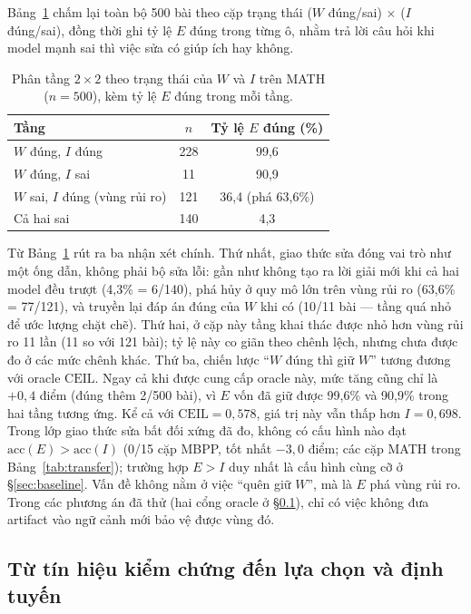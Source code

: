 \documentclass[11pt,a4paper]{article}
\newcommand{\CEIL}{\mathrm{CEIL}}
\newcommand{\acc}{\mathrm{acc}}
\begin{document}
Bảng~\ref{tab:222} chấm lại toàn bộ 500 bài theo cặp trạng thái ($W$ đúng/sai) $\times$ ($I$ đúng/sai), đồng thời ghi tỷ lệ $E$ đúng trong từng ô, nhằm trả lời câu hỏi khi model mạnh sai thì việc sửa có giúp ích hay không.

\begin{table}[htbp]
\centering
\small
\begin{tabular}{@{}l c c@{}}
\toprule
Tầng & $n$ & Tỷ lệ $E$ đúng (\%) \\
\midrule
$W$ đúng, $I$ đúng & 228 & 99,6\\
$W$ đúng, $I$ sai & 11 & 90,9\\
$W$ sai, $I$ đúng (vùng rủi ro) & 121 & 36,4 \quad (phá 63,6\%)\\
Cả hai sai & 140 & 4,3\\
\bottomrule
\end{tabular}
\caption{Phân tầng $2\times 2$ theo trạng thái của $W$ và $I$ trên MATH ($n=500$), kèm tỷ lệ $E$ đúng trong mỗi tầng.}
\label{tab:222}
\end{table}

Từ Bảng~\ref{tab:222} rút ra ba nhận xét chính. Thứ nhất, giao thức sửa đóng vai trò như một ống dẫn, không phải bộ sửa lỗi: gần như không tạo ra lời giải mới khi cả hai model đều trượt (4,3\% = 6/140), phá hủy ở quy mô lớn trên vùng rủi ro (63,6\% = 77/121), và truyền lại đáp án đúng của $W$ khi có (10/11 bài --- tầng quá nhỏ để ước lượng chặt chẽ). Thứ hai, ở cặp này tầng khai thác được nhỏ hơn vùng rủi ro 11 lần (11 so với 121 bài); tỷ lệ này co giãn theo chênh lệch, nhưng chưa được đo ở các mức chênh khác. Thứ ba, chiến lược “$W$ đúng thì giữ $W$” tương đương với oracle $\CEIL$. Ngay cả khi được cung cấp oracle này, mức tăng cũng chỉ là $+0{,}4$ điểm (đúng thêm 2/500 bài), vì $E$ vốn đã giữ được 99,6\% và 90,9\% trong hai tầng tương ứng. Kể cả với $\CEIL = 0{,}578$, giá trị này vẫn thấp hơn $I = 0{,}698$. Trong lớp giao thức sửa bất đối xứng đã đo, không có cấu hình nào đạt $\acc(E) > \acc(I)$ (0/15 cặp MBPP, tốt nhất $-3{,}0$ điểm; các cặp MATH trong Bảng~\ref{tab:transfer}); trường hợp $E>I$ duy nhất là cấu hình cùng cỡ ở \S\ref{sec:baseline}. Vấn đề không nằm ở việc “quên giữ $W$”, mà là $E$ phá vùng rủi ro. Trong các phương án đã thử (hai cổng oracle ở \S\ref{sec:kappa}), chỉ có việc không đưa artifact vào ngữ cảnh mới bảo vệ được vùng đó.

\subsection{Từ tín hiệu kiểm chứng đến lựa chọn và định tuyến}\label{sec:kappa}
\end{document}
